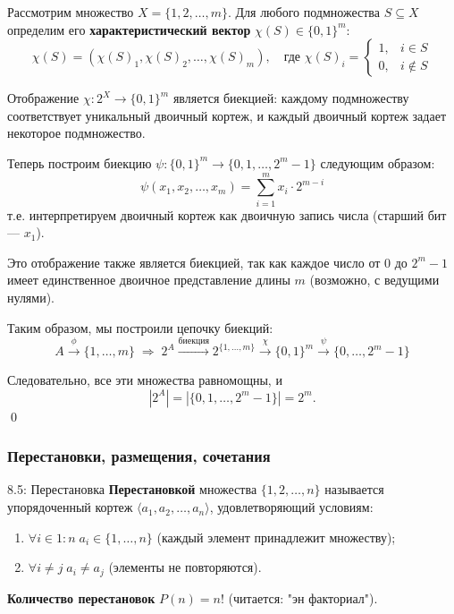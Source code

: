 \documentclass[a4paper,12pt]{article}
\begin{document}
	Рассмотрим множество $X = \{1, 2, \dots, m\}$. Для любого подмножества $S \subseteq X$ определим его \textbf{характеристический вектор} $\chi(S) \in \{0, 1\}^m$:
	\[ \chi(S) = (\chi(S)_1, \chi(S)_2, \dots, \chi(S)_m), \quad \text{где } \chi(S)_i = \begin{cases}
		1, & i \in S \\
		0, & i \notin S
	\end{cases} \]
	
	Отображение $\chi: 2^X \to \{0, 1\}^m$ является биекцией: каждому подмножеству соответствует уникальный двоичный кортеж, и каждый двоичный кортеж задает некоторое подмножество.
	
	Теперь построим биекцию $\psi: \{0, 1\}^m \to \{0, 1, \dots, 2^m-1\}$ следующим образом:
	\[ \psi(x_1, x_2, \dots, x_m) = \sum_{i=1}^m x_i \cdot 2^{m-i} \]
	т.е. интерпретируем двоичный кортеж как двоичную запись числа (старший бит — $x_1$).
	
	Это отображение также является биекцией, так как каждое число от $0$ до $2^m-1$ имеет единственное двоичное представление длины $m$ (возможно, с ведущими нулями).
	
	Таким образом, мы построили цепочку биекций:
	\[ A \xrightarrow{\phi} \{1,\dots,m\} \;\Rightarrow\; 2^A \xrightarrow{\text{биекция}} 2^{\{1,\dots,m\}} \xrightarrow{\chi} \{0,1\}^m \xrightarrow{\psi} \{0,\dots,2^m-1\} \]
	
	Следовательно, все эти множества равномощны, и
	\[ |2^A| = |\{0,1,\dots,2^m-1\}| = 2^m. \]
	\qed
	
	\subsubsection{Перестановки, размещения, сочетания}
	
	\begin{definitionbox}{8.5: Перестановка}
		\textbf{Перестановкой} множества $\{1, 2, \dots, n\}$ называется упорядоченный кортеж $\langle a_1, a_2, \dots, a_n \rangle$, удовлетворяющий условиям:
		\begin{enumerate}
			\item $\forall i \in 1:n \; a_i \in \{1, \dots, n\}$ (каждый элемент принадлежит множеству);
			\item $\forall i \neq j \; a_i \neq a_j$ (элементы не повторяются).
		\end{enumerate}
		
		\textbf{Количество перестановок} $P(n) = n!$ (читается: "эн факториал").
	\end{definitionbox}
	
\end{document}

